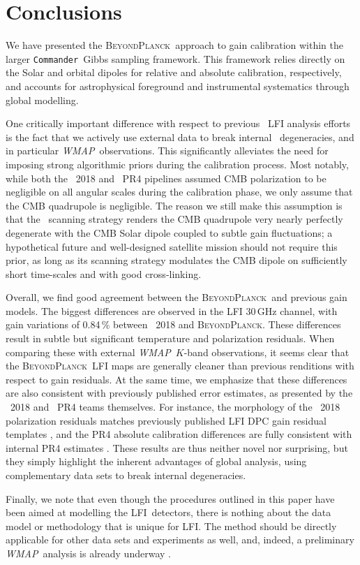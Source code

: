 \documentclass[twocolumn]{aa}
\def\WMAP{\textit{WMAP}}
\def\commander{\texttt{Commander}}
\newcommand{\BP}{\textsc{BeyondPlanck}}
\newcommand{\lfi}[0]{LFI}
\begin{document}
\section{Conclusions}
\label{sec:conclusions}

We have presented the \BP\ approach to gain calibration within the
larger \commander\ Gibbs sampling framework. This framework relies
directly on the Solar and orbital dipoles for relative and absolute
calibration, respectively, and accounts for astrophysical foreground
and instrumental systematics through global modelling.

One critically important difference with respect to previous
\Planck\ LFI analysis efforts is the fact that we actively use
external data to break internal \Planck\ degeneracies, and in
particular \WMAP\ observations. This significantly alleviates the need
for imposing strong algorithmic priors during the calibration
process. Most notably, while both the \Planck\ 2018 and
\Planck\ PR4 pipelines assumed CMB polarization to be negligible on all
angular scales during the calibration phase, we only assume that the
CMB quadrupole is negligible. The reason we still make this assumption
is that the \Planck\ scanning strategy renders the CMB quadrupole very
nearly perfectly degenerate with the CMB Solar dipole coupled to
subtle gain fluctuations; a hypothetical future and well-designed
satellite mission should not require this prior, as long as its
scanning strategy modulates the CMB dipole on sufficiently short
time-scales and with good cross-linking.

Overall, we find good agreement between the \BP\ and previous gain
models. The biggest differences are observed in the LFI 30\,GHz
channel, with gain variations of 0.84\,\%  between \Planck\ 2018 and \BP. These differences
result in subtle but significant temperature and polarization
residuals. When comparing these with external \WMAP\ $K$-band
observations, it seems clear that the \BP\ LFI maps are generally
cleaner than previous renditions with respect to gain residuals. At
the same time, we emphasize that these differences are also consistent
with previously published error estimates, as presented by the
\Planck\ 2018 and \Planck\ PR4 teams themselves. For instance, the
morphology of the \Planck\ 2018 polarization residuals matches
previously published LFI DPC gain residual templates
\citep{planck2016-l02}, and the PR4 absolute calibration
differences are fully consistent with internal PR4 estimates
\citep{planck2020-LVII}. These results are thus neither novel nor
surprising, but they simply highlight the inherent advantages of
global analysis, using complementary data sets to break internal
degeneracies.

Finally, we note that even though the procedures outlined in this
paper have been aimed at modelling the \lfi\ detectors, there is
nothing about the data model or methodology that is unique for
\lfi. The method should be directly applicable for other data sets and
experiments as well, and, indeed, a preliminary \WMAP\ analysis is
already underway \citep{bp17}.






\end{document}
